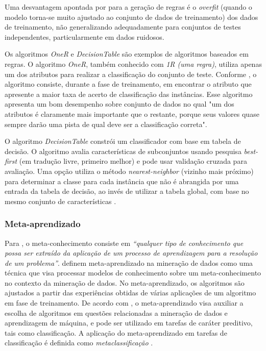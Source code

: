 Uma desvantagem apontada por \citet{witten2005} para a geração de regras é o \textit{overfit} (quando o modelo torna-se muito ajustado ao conjunto de dados de treinamento) dos dados de treinamento, não generalizando adequadamente para conjuntos de testes independentes, particularmente em dados ruidosos.  

Os algoritmos \textit{OneR} e \textit{DecisionTable} são exemplos de algoritmos baseados em regras. O algoritmo \textit{OneR}, também conhecido com \textit{1R (uma regra)}, utiliza apenas um dos atributos para realizar a classificação do conjunto de teste. Conforme \citet{zampirolli2014}, o algoritmo consiste, durante a fase de treinamento, em encontrar o atributo que apresente a maior taxa de acerto de classificação das instâncias. Esse algoritmo apresenta um bom desempenho sobre conjunto de dados no qual "um dos atributos é claramente mais importante que o restante, porque seus valores quase sempre darão uma pista de qual deve ser a classificação correta".

O algoritmo \textit{DecisionTable} constrói um classificador com base em tabela de decisão. O algoritmo avalia características de subconjuntos usando pesquisa \textit{best-first} (em tradução livre, primeiro melhor) e pode usar validação cruzada para avaliação. Uma opção utiliza o método \textit{nearest-neighbor} (vizinho mais próximo) para determinar a classe para cada instância que não é abrangida por uma entrada da tabela de decisão, ao invés de utilizar a tabela global, com base no mesmo conjunto de características \citep{witten2005}. 


\subsubsection{Meta-aprendizado} \label{subsubtitle3}

Para \citet[p. 188]{carrier2004}, o  meta-conhecimento consiste em \textit{“qualquer tipo de conhecimento que possa ser extraído da aplicação de um processo de aprendizagem para a resolução de um problema”}. \citet{bezerra2015} definem meta-aprendizado na mineração de dados como uma técnica que visa processar modelos de conhecimento sobre um meta-conhecimento no contexto da mineração de dados. No meta-aprendizado, os algoritmos são ajustados a partir das experiências obtidas de várias aplicações de um algoritmo em fase de treinamento. De acordo com \citet{souza2010}, o meta-aprendizado visa auxiliar a escolha de algoritmos em questões relacionadas a mineração de dados e aprendizagem de máquina, e pode ser utilizado em tarefas de caráter preditivo, tais como classificação. A aplicação do meta-aprendizado em tarefas de classificação é definida como \textit{metaclassificação} \citep{bezerra2015}.

